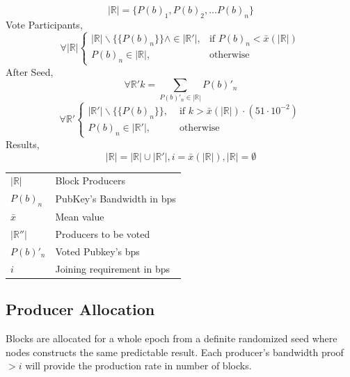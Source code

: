 \documentclass[a4paper,10pt]{article}
\makeatletter
\newenvironment{conditions}
  {\par\vspace{\abovedisplayskip}\noindent\begin{tabular}{>{$}l<{$} @{${}={}$} l}}
  {\end{tabular}\par\vspace{\belowdisplayskip}}
\makeatother
\begin{document}
\begin{equation*}
|\mathbb{R}| = \{P(b)_1,P(b)_2,...P(b)_n\} 
\end{equation*}
Vote Participants,
\begin{equation*}
\forall |\mathbb{R}| \begin{cases}
|\mathbb{R}| \backslash \{\{P(b)_n\}\} \wedge \in |\mathbb{R}'|, & \text{if } P(b)_n < \bar{x}(|\mathbb{R}|) \\
P(b)_n \in |\mathbb{R}|,  & \text{otherwise}
\end{cases}
\end{equation*}
After Seed,
\begin{equation*}
\forall \mathbb{R'} k = \sum_{P(b)'_n \in |\mathbb{R}|} P(b)'_n
\end{equation*}
\begin{equation*}
\forall \mathbb{R'} \begin{cases}
|\mathbb{R}'| \backslash \{\{P(b)_n\}\}, & \text{ if } k > \bar{x}(|\mathbb{R}|) \cdot (51 \cdot 10^{-2})\\
P(b)_n \in |\mathbb{R}'|, & \text{ otherwise}
\end{cases}
\end{equation*}
Results, 
\begin{equation*}
|\mathbb{R}| = |\mathbb{R}| {\displaystyle \cup } |\mathbb{R}'|, i = \bar{x}(|\mathbb{R}|), |\mathbb{R}|=\emptyset
\end{equation*}
\begin{conditions}
|\mathbb{R}| & Block Producers\\
P(b)_n & PubKey's Bandwidth in bps \\
\bar{x} & Mean value\\
|\mathbb{R}''| & Producers to be voted\\
P(b)'_n & Voted Pubkey's bps\\
i & Joining requirement in bps 
\end{conditions}

\subsection{Producer Allocation}

Blocks are allocated for a whole epoch from a definite randomized seed where nodes constructs the same predictable result. Each producer's bandwidth proof $> i$ will provide the production rate in number of blocks.
\end{document}
